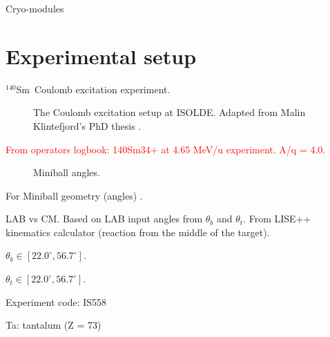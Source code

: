 \documentclass[twoside,english]{uiofysmaster/uiofysmaster}
\newcommand{\Sm}{$^{140}$Sm} %
\begin{document}
\bigskip

Cryo-modules

\section{Experimental setup}
\Sm ~Coulomb excitation experiment.


\begin{figure}[ht]
	\centering
	
	\caption{The Coulomb excitation setup at ISOLDE. Adapted from Malin Klintefjord's PhD thesis \cite{Klintefjord}.}
	\label{fig:Coulex}
\end{figure}

\textcolor{red}{From operators logbook: 140Sm34+ at 4.65 MeV/u experiment. A/q = 4.0.}


\begin{figure}[ht]
	\centering
	
	\caption{Miniball angles.}
	\label{fig:MB-angles}
\end{figure}


\begin{table}[ht] 
	\centering 
	
\end{table}
For Miniball geometry (angles) \cite{NWarr-Angles}. 







\begin{table}[ht] 
    \centering 
    \caption{LAB vs CM. Based on LAB input angles from $\theta_b$ and $\theta_t$. From LISE++ kinematics calculator (reaction from the middle of the target).}
	\label{tab:LABvsCM}
    \begin{subtable}{0.45\textwidth}
    		\centering
		\caption{$\theta_b \in [22.0^\circ, 56.7^\circ]$.}
	 	\label{tab:LABvsCM_b}
	 	
	\end{subtable}
	\begin{subtable}{0.45\textwidth}
		\centering
		\caption{$\theta_t \in [22.0^\circ, 56.7^\circ]$.}
		\label{tab:LABvsCM_t}
		
	\end{subtable}
\end{table}



\bigskip

Experiment code: IS558 

Ta: tantalum (Z = 73)
\end{document}
